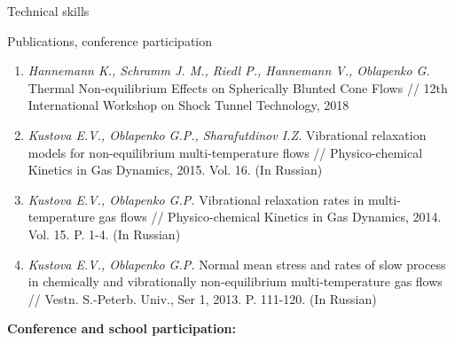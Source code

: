 \documentclass{resume} %
\begin{document}
\begin{rSection}{Technical skills}
\begin{rSection}{Publications, conference participation}
\begin{enumerate}
    \item \emph{Hannemann K., Schramm J. M., Riedl P., Hannemann V., Oblapenko G.} Thermal Non-equilibrium Effects on Spherically Blunted Cone Flows // 12th International Workshop on Shock Tunnel Technology, 2018

    \item  \emph{Kustova E.V., Oblapenko G.P., Sharafutdinov I.Z.} Vibrational relaxation models for non-equilibrium multi-temperature flows // Physico-chemical Kinetics in Gas Dynamics, 2015. Vol. 16. (In Russian)

    \item  \emph{Kustova E.V., Oblapenko G.P.} Vibrational relaxation rates in multi-temperature gas flows // Physico-chemical Kinetics in Gas Dynamics, 2014. Vol. 15. P. 1-4. (In Russian)

    \item  \emph{Kustova E.V., Oblapenko G.P.} Normal mean stress and rates of slow process in chemically and vibrationally non-equilibrium multi-temperature gas flows // Vestn. S.-Peterb. Univ., Ser 1, 2013. P. 111-120. (In Russian)
\end{enumerate}

{\bf Conference and school participation:}


\end{rSection}
\end{rSection}
\end{document}
